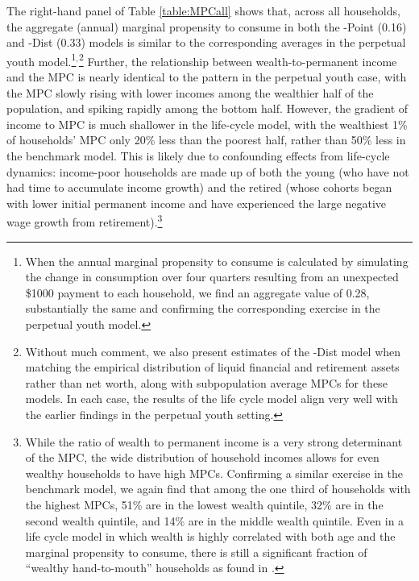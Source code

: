 \documentclass[12pt,titlepage]{econtex}
\begin{document}
The right-hand panel of Table \ref{table:MPCall} shows that, across all households, the aggregate (annual) marginal propensity to consume in both the \Discount-Point (0.16) and \Discount-Dist (0.33) models is similar to the corresponding averages in the perpetual youth model.\footnote{When the annual marginal propensity to consume is calculated by simulating the change in consumption over four quarters resulting from an unexpected \$1000 payment to each household, we find an aggregate value of 0.28, substantially the same and confirming the corresponding exercise in the perpetual youth model.}$^{,}$\footnote{Without much comment, we also present estimates of the \Discount-Dist model when matching the empirical distribution of liquid financial and retirement assets rather than net worth, along with subpopulation average MPCs for these models.  In each case, the results of the life cycle model align very well with the earlier findings in the perpetual youth setting.}  Further, the relationship between wealth-to-permanent income and the MPC is nearly identical to the pattern in the perpetual youth case, with the MPC slowly rising with lower incomes among the wealthier half of the population, and spiking rapidly among the bottom half.  However, the gradient of income to MPC is much shallower in the life-cycle model, with the wealthiest 1\% of households' MPC only 20\% less than the poorest half, rather than 50\% less in the benchmark model.  This is likely due to confounding effects from life-cycle dynamics: income-poor households are made up of both the young (who have not had time to accumulate income growth) and the retired (whose cohorts began with lower initial permanent income and have experienced the large negative wage growth from retirement).\footnote{%
  While the ratio of wealth to permanent income is a very strong determinant of the MPC, the wide distribution of household incomes allows for even wealthy households to have high MPCs.  Confirming a similar exercise in the benchmark model, we again find that among the one third of households with the highest MPCs, 51\% are in the lowest wealth quintile, 32\% are in the second wealth quintile, and 14\% are in the middle wealth quintile.  Even in a life cycle model in which wealth is highly correlated with both age and the marginal propensity to consume, there is still a significant fraction of ``wealthy hand-to-mouth'' households as found in \cite{kaplanViolanteWeidner_wealthyH2M}.}
\end{document}
